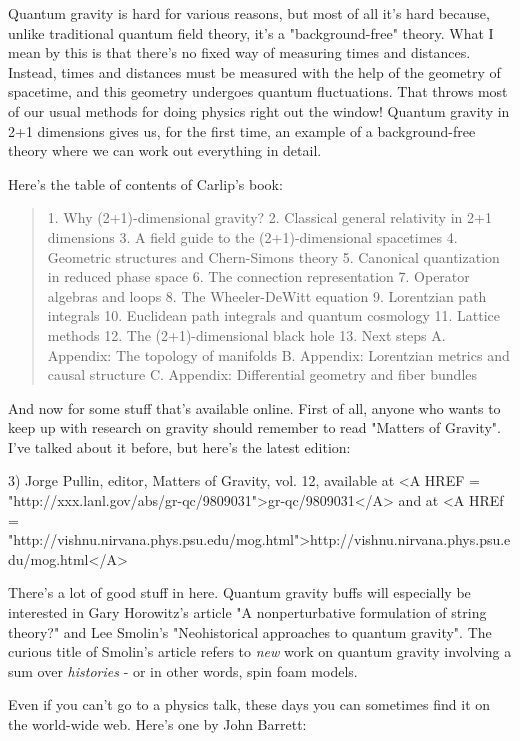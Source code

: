 Quantum gravity is hard for various reasons, but most of all it's hard
because, unlike traditional quantum field theory, it's a "background-free" 
theory.  What I mean by this is that there's no fixed way of measuring
times and distances.  Instead, times and distances must be measured with
the help of the geometry of spacetime, and this geometry undergoes
quantum fluctuations.  That throws most of our usual methods for doing
physics right out the window!  Quantum gravity in 2+1 dimensions gives
us, for the first time, an example of a background-free theory where we
can work out everything in detail.  

Here's the table of contents of Carlip's book:
\begin{quote}
 1. Why (2+1)-dimensional gravity?
 2. Classical general relativity in 2+1 dimensions
 3. A field guide to the (2+1)-dimensional spacetimes
 4. Geometric structures and Chern-Simons theory
 5. Canonical quantization in reduced phase space
 6. The connection representation
 7. Operator algebras and loops
 8. The Wheeler-DeWitt equation
 9. Lorentzian path integrals
10. Euclidean path integrals and quantum cosmology
11. Lattice methods
12. The (2+1)-dimensional black hole
13. Next steps
 A. Appendix: The topology of manifolds
 B. Appendix: Lorentzian metrics and causal structure
 C. Appendix: Differential geometry and fiber bundles

\end{quote}
And now for some stuff that's available online.   First of all, anyone
who wants to keep up with research on gravity should remember to read
"Matters of Gravity".  I've talked about it before, but here's the
latest edition:

3) Jorge Pullin, editor, Matters of Gravity, vol. 12, available at 
<A HREF = "http://xxx.lanl.gov/abs/gr-qc/9809031">gr-qc/9809031</A> and at
<A HREf = "http://vishnu.nirvana.phys.psu.edu/mog.html">http://vishnu.nirvana.phys.psu.edu/mog.html</A>


There's a lot of good stuff in here.  Quantum gravity buffs will
especially be interested in Gary Horowitz's article "A nonperturbative
formulation of string theory?" and Lee Smolin's "Neohistorical
approaches to quantum gravity".  The curious title of Smolin's article
refers to \emph{new} work on quantum gravity involving a sum over 
\emph{histories}
- or in other words, spin foam models.

Even if you can't go to a physics talk, these days you can sometimes 
find it on the world-wide web.  Here's one by John Barrett:

